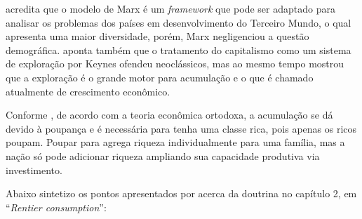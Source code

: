 	 acredita que o modelo  de Marx é um \textit{framework} que pode ser adaptado para analisar os problemas dos países em desenvolvimento do Terceiro Mundo, o qual apresenta uma maior diversidade, porém, Marx negligenciou a questão demográfica.  aponta também que o tratamento do capitalismo como um sistema de exploração por Keynes ofendeu neoclássicos, mas ao mesmo tempo mostrou que a exploração é o grande motor para acumulação e o que é chamado atualmente de crescimento econômico.
	
	Conforme , de acordo com a teoria econômica ortodoxa, a acumulação se dá devido à poupança e é necessária para tenha uma classe rica, pois apenas os ricos poupam. Poupar para agrega riqueza individualmente para uma família, mas a nação só pode adicionar riqueza ampliando sua capacidade produtiva via investimento. 
	
	Abaixo sintetizo os pontos apresentados por  acerca da doutrina no capítulo 2, em ``\textit{Rentier consumption}'':
	
